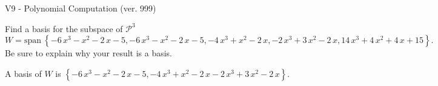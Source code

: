 \begin{exercise}
  \begin{exerciseTitle}V9 - Polynomial Computation (ver. 999)\end{exerciseTitle}
  \begin{exerciseStatement}
    Find a basis for the subspace of \(\mathcal{P}^3\) 
\[W=\mathrm{span}\ \left\{-6 \, x^{3} - x^{2} - 2 \, x - 5 , -6 \, x^{3} - x^{2} - 2 \, x - 5 , -4 \, x^{3} + x^{2} - 2 \, x , -2 \, x^{3} + 3 \, x^{2} - 2 \, x , 14 \, x^{3} + 4 \, x^{2} + 4 \, x + 15\right\}.\]
 Be sure to explain why your result is a basis.


  \end{exerciseStatement}
  \begin{exerciseAnswer}
   A basis of \(W\) is  \(\left\{-6 \, x^{3} - x^{2} - 2 \, x - 5 , -4 \, x^{3} + x^{2} - 2 \, x -2 \, x^{3} + 3 \, x^{2} - 2 \, x\right\}\).
  


  \end{exerciseAnswer}
\end{exercise}